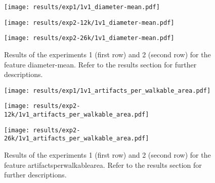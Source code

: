 \begin{figure}[h!]
	\centering
	\begin{minipage}{0.4\linewidth}
		\texttt{[image: results/exp1/1v1\_diameter-mean.pdf]}
	\end{minipage}
	
	\begin{minipage}{0.4\linewidth}
		\texttt{[image: results/exp2-12k/1v1\_diameter-mean.pdf]}
	\end{minipage}
	\begin{minipage}{0.4\linewidth}
		\texttt{[image: results/exp2-26k/1v1\_diameter-mean.pdf]}
	\end{minipage}
	
	\caption[ Results: Feature diameter-mean]{ Results of the experiments 1 (first row) and 2 (second row) for the feature diameter-mean. Refer to the results section for further descriptions. }
	\label{fig:appendix_diameter-mean}
\end{figure}
\newpage 


\begin{figure}[h!]
	\centering
	\begin{minipage}{0.4\linewidth}
		\texttt{[image: results/exp1/1v1\_artifacts\_per\_walkable\_area.pdf]}
	\end{minipage}
	
	\begin{minipage}{0.4\linewidth}
		\texttt{[image: results/exp2-12k/1v1\_artifacts\_per\_walkable\_area.pdf]}
	\end{minipage}
	\begin{minipage}{0.4\linewidth}
		\texttt{[image: results/exp2-26k/1v1\_artifacts\_per\_walkable\_area.pdf]}
	\end{minipage}
	
	\caption[ Results: Feature artifacts\textunderscore per\textunderscore walkable\textunderscore area]{ Results of the experiments 1 (first row) and 2 (second row) for the feature artifacts\textunderscore per\textunderscore walkable\textunderscore area. Refer to the results section for further descriptions. }
	\label{fig:appendix_artifacts_per_walkable_area}
\end{figure}

